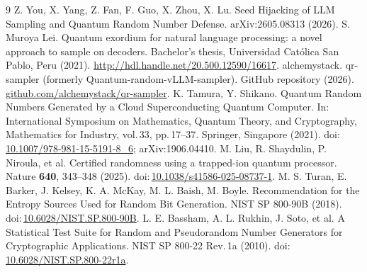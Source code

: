\documentclass[11pt]{article}
\begin{document}
\begin{thebibliography}{9}
 Z. You, X. Yang, Z. Fan, F. Guo, X. Zhou, X. Lu. Seed Hijacking of LLM Sampling and Quantum Random Number Defense. arXiv:2605.08313 (2026).
 S. Muroya Lei. Quantum exordium for natural language processing: a novel approach to sample on decoders. Bachelor's thesis, Universidad Católica San Pablo, Peru (2021). \url{http://hdl.handle.net/20.500.12590/16617}.
 alchemystack. qr-sampler (formerly Quantum-random-vLLM-sampler). GitHub repository (2026).\\ \url{github.com/alchemystack/qr-sampler}.
 K. Tamura, Y. Shikano. Quantum Random Numbers Generated by a Cloud Superconducting Quantum Computer. In: International Symposium on Mathematics, Quantum Theory, and Cryptography, Mathematics for Industry, vol.\,33, pp.\,17--37. Springer, Singapore (2021). doi:\,\url{10.1007/978-981-15-5191-8_6}; arXiv:1906.04410.
 M. Liu, R. Shaydulin, P. Niroula, et al. Certified randomness using a trapped-ion quantum processor. Nature \textbf{640}, 343--348 (2025). doi:\,\url{10.1038/s41586-025-08737-1}.
 M. S. Turan, E. Barker, J. Kelsey, K. A. McKay, M. L. Baish, M. Boyle. Recommendation for the Entropy Sources Used for Random Bit Generation. NIST SP 800-90B (2018). doi:\,\url{10.6028/NIST.SP.800-90B}.
 L. E. Bassham, A. L. Rukhin, J. Soto, et al. A Statistical Test Suite for Random and Pseudorandom Number Generators for Cryptographic Applications. NIST SP 800-22 Rev.\,1a (2010). doi:\,\url{10.6028/NIST.SP.800-22r1a}.
\end{thebibliography}
\end{document}
